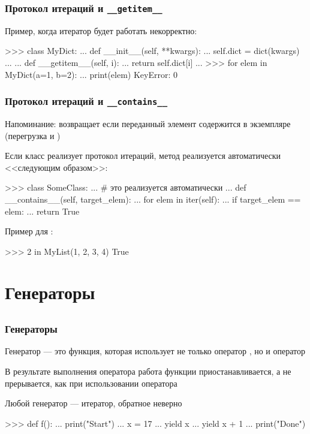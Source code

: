 \documentclass[fleqn, xcolor=x11names]{beamer}
\begin{document}
\begin{frame}[fragile]\frametitle{Протокол итераций и \texttt{\_\_getitem\_\_}}
Пример, когда итератор будет работать некорректно:
\begin{pcode}
>>> class MyDict:
...     def __init__(self, **kwargs):
...         self.dict = dict(kwargs)
...         
...     def __getitem__(self, i):
...         return self.dict[i]
...
>>> for elem in MyDict(a=1, b=2):
...    print(elem)
KeyError: 0
\end{pcode}
\end{frame}

\begin{frame}[fragile]\frametitle{Протокол итераций и \texttt{\_\_contains\_\_}}
Напоминание:  возвращает  если переданный элемент содержится в экземпляре (перегрузка  и )

\hfill

Если класс реализует протокол итераций, метод  реализуется автоматически <<следующим образом>>:

\begin{pcode}
>>> class SomeClass:
...     # это реализуется автоматически
...     def __contains__(self, target_elem):
...         for elem in iter(self):
...             if target_elem == elem:
...                 return True
\end{pcode}

\hfill

Пример для :
\begin{pcode}
>>> 2 in MyList(1, 2, 3, 4)
True
\end{pcode}

\end{frame}

\section{Генераторы}
\subsection*{}
\begin{frame}[fragile]\frametitle{Генераторы}
Генератор --- это функция, которая использует не только оператор , но и оператор 

\hfill

В результате выполнения оператора  работа функции приостанавливается, а не прерывается, как при использовании оператора 

\hfill

Любой генератор --- итератор, обратное неверно


\begin{pcode}
>>> def f():
...     print("Start")
...     x = 17
...     yield x
...     yield x + 1
...     print("Done")
\end{pcode}

\end{frame}
\end{document}
